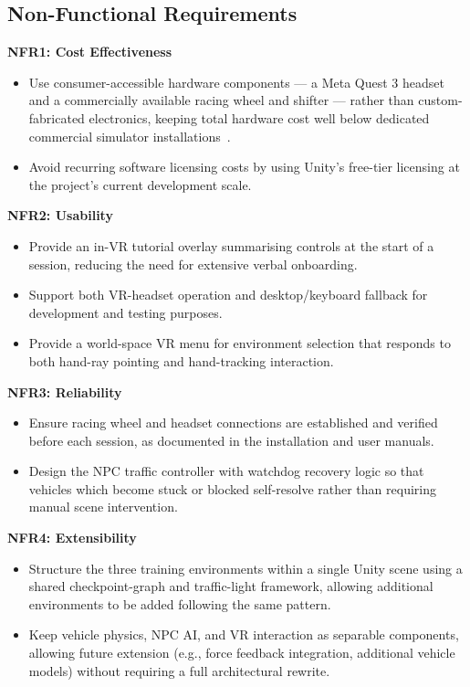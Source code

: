 \subsection{Non-Functional Requirements}

\textbf{NFR1: Cost Effectiveness}
\begin{itemize}
    \item Use consumer-accessible hardware components — a Meta Quest 3 headset and a commercially available racing wheel and shifter — rather than custom-fabricated electronics, keeping total hardware cost well below dedicated commercial simulator installations~\cite{Silvera2022}.
    \item Avoid recurring software licensing costs by using Unity's free-tier licensing at the project's current development scale.
\end{itemize}

\textbf{NFR2: Usability}
\begin{itemize}
    \item Provide an in-VR tutorial overlay summarising controls at the start of a session, reducing the need for extensive verbal onboarding.
    \item Support both VR-headset operation and desktop/keyboard fallback for development and testing purposes.
    \item Provide a world-space VR menu for environment selection that responds to both hand-ray pointing and hand-tracking interaction.
\end{itemize}

\textbf{NFR3: Reliability}
\begin{itemize}
    \item Ensure racing wheel and headset connections are established and verified before each session, as documented in the installation and user manuals.
    \item Design the NPC traffic controller with watchdog recovery logic so that vehicles which become stuck or blocked self-resolve rather than requiring manual scene intervention.
\end{itemize}

\textbf{NFR4: Extensibility}
\begin{itemize}
    \item Structure the three training environments within a single Unity scene using a shared checkpoint-graph and traffic-light framework, allowing additional environments to be added following the same pattern.
    \item Keep vehicle physics, NPC AI, and VR interaction as separable components, allowing future extension (e.g., force feedback integration, additional vehicle models) without requiring a full architectural rewrite.
\end{itemize}

